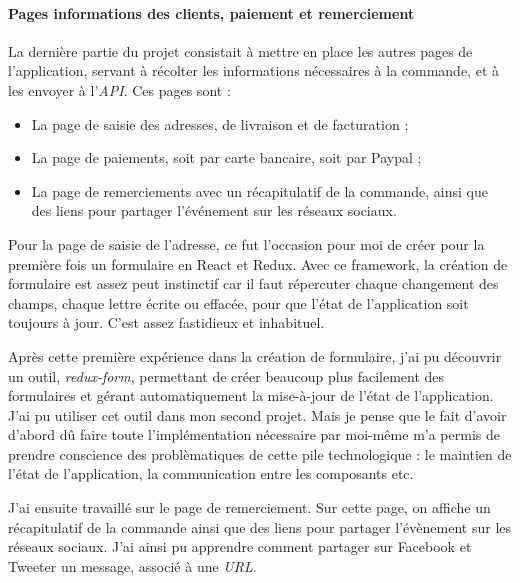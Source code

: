 \paragraph{Pages informations des clients, paiement et
remerciement}\label{pages-informations-des-clients-paiement-et-remerciement}

\bigskip

La dernière partie du projet consistait à mettre en place les autres
pages de l'application, servant à récolter les informations nécessaires
à la commande, et à les envoyer à l'\emph{API}. Ces pages sont :

\begin{itemize}
\tightlist
\item
  La page de saisie des adresses, de livraison et de facturation ;
\item
  La page de paiements, soit par carte bancaire, soit par Paypal ;
\item
  La page de remerciements avec un récapitulatif de la commande, ainsi
  que des liens pour partager l'événement sur les réseaux sociaux.
\end{itemize}

\bigskip

Pour la page de saisie de l'adresse, ce fut l'occasion pour moi de créer
pour la première fois un formulaire en React et Redux. Avec ce
framework, la création de formulaire est assez peut instinctif car il
faut répercuter chaque changement des champs, chaque lettre écrite ou
effacée, pour que l'état de l'application soit toujours à jour. C'est
assez fastidieux et inhabituel.

\bigskip

Après cette première expérience dans la création de formulaire, j'ai pu
découvrir un outil, \emph{redux-form}, permettant de créer beaucoup plus
facilement des formulaires et gérant automatiquement la mise-à-jour de
l'état de l'application. J'ai pu utiliser cet outil dans mon second
projet. Mais je pense que le fait d'avoir d'abord dû faire toute
l'implémentation nécessaire par moi-même m'a permis de prendre
conscience des problèmatiques de cette pile technologique : le maintien
de l'état de l'application, la communication entre les composants etc.

\bigskip

J'ai ensuite travaillé sur le page de remerciement. Sur cette page, on
affiche un récapitulatif de la commande ainsi que des liens pour
partager l'évènement sur les réseaux sociaux. J'ai ainsi pu apprendre
comment partager sur Facebook et Tweeter un message, associé à une
\emph{URL}.

